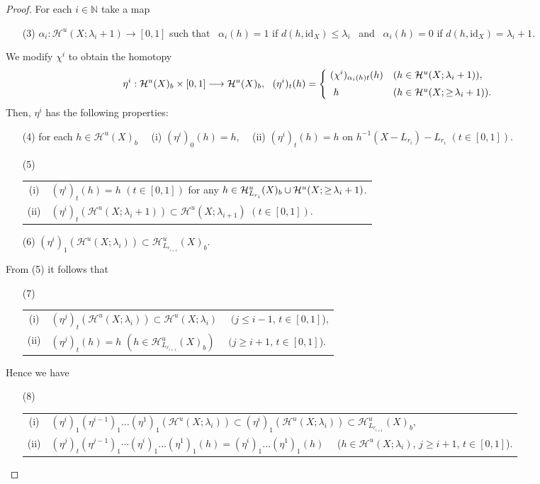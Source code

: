 \documentclass[11pt, fleqn]{amsart}
\theoremstyle{definition}
\newcommand{\cal}{\mathcal}
\newcommand{\lra}{\longrightarrow}
\newcommand{\id}{\mathrm{id}}
\newcommand{\IN}{\mathbb N}
\begin{document}
\begin{proof}
For each $i \in \IN$ take a map 
\begin{itemize}
\item[(3)] $\alpha_i : {\cal H}^u(X; \lambda_i+1) \to [0,1]$ such that \ $\alpha_i(h) = 1$ if $d(h, \id_X) \leq \lambda_i$
\ and \ $\alpha_i(h) = 0$ if $d(h, \id_X) = \lambda_i+1$. 
\end{itemize} 
We modify $\chi^i$ to obtain the homotopy 
$$\eta^i : {\cal H}^u(X)_b \times [0,1] \lra {\cal H}^u(X)_b, \ \ 
(\eta^i)_t(h) = \left\{ \begin{array}[c]{@{\ }ll}
(\chi^i)_{\alpha_i(h) t}(h) & (h \in {\cal H}^u(X; \lambda_i+1)), \\[2mm] 
\ h & (h \in {\cal H}^u(X; \geq \hspace{-0.5mm}\lambda_i+1)). 
\end{array} \right.$$
Then, $\eta^i$ has the following properties: \ 
\begin{itemize}
\item[(4)] for each $h \in {\cal H}^u(X)_b$ \ \ 
(i) $(\eta^i)_0(h) = h$, \ \  (ii) $(\eta^i)_t(h) = h$ on $h^{-1}(X - L_{r_i}) - L_{r_i}$ $(t \in [0,1])$. 
\item[(5)] 
\begin{tabular}[t]{c@{\ }l}
(i) & $(\eta^i)_t(h) = h$ $(t \in [0,1])$ for any $h \in {\cal H}^u_{L_{r_i}}(X)_b \cup {\cal H}^u(X; \geq \hspace{-0.5mm}\lambda_i+1)$. \\[1.5mm]  
(ii) & $(\eta^i)_t({\cal H}^u(X; \lambda_i+1)) \subset {\cal H}^u(X; \lambda_{i+1})$ $(t \in [0,1])$. 
\end{tabular}
\vskip 1.5mm 
\item[(6)] $(\eta^i)_1({\cal H}^u(X; \lambda_i)) \subset {\cal H}^u_{L_{r_{i+1}}}(X)_b$. 
\end{itemize}
From (5) it follows that 
\begin{itemize}
\item[(7)] 
\begin{tabular}[t]{c@{\ }l}
(i) & $(\eta^j)_t({\cal H}^u(X;\lambda_i)) \subset {\cal H}^u(X;\lambda_i)$ \ \ $(j \leq i-1$, $t \in [0,1]$), \\[1.5mm]
(ii) & $(\eta^j)_t(h) = h$ $(h \in {\cal H}^u_{L_{r_{i+1}}}(X)_b)$ \ \ $(j \geq i+1$, $t \in [0,1]$).
\end{tabular} 
\end{itemize}
\vskip 1.5mm 
Hence we have 
\begin{itemize}
\item[(8)] 
\begin{tabular}[t]{c@{\ }l}
(i) & $(\eta^i)_1(\eta^{i-1})_1 \dots (\eta^1)_1({\cal H}^u(X;\lambda_i)) \subset (\eta^i)_1({\cal H}^u(X; \lambda_i)) \subset {\cal H}^u_{L_{r_{i+1}}}(X)_b$, \\[1.5mm]
(ii) & $(\eta^j)_t (\eta^{j-1})_1 \cdots (\eta^i)_1 \dots (\eta^1)_1(h) = (\eta^i)_1 \dots (\eta^1)_1(h)$ \ \ ($h \in {\cal H}^u(X;\lambda_i)$, $j \geq i+1$, $t \in [0,1]$). 
\end{tabular}  
\end{itemize}
\vskip 1mm 


\end{proof}
\end{document}
